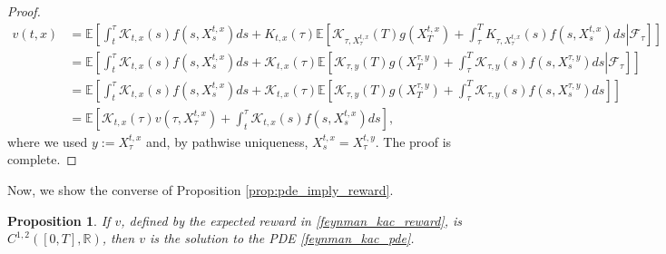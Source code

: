 \documentclass{article}
\newtheorem{prop}{Proposition}
\begin{document}
\begin{proof}
\begin{equation*}
\begin{aligned}
v(t,x)&=\mathbb{E}\left[\int^\tau_t\mathcal{K}_{t,x}(s)f(s,X_s^{t,x})ds+K_{t,x}(\tau)\left.\mathbb{E}\left[\mathcal{K}_{\tau,X_\tau^{t,x}}(T)g(X_T^{t,x})+\int^T_\tau K_{\tau,X_\tau^{t,x}}(s)f(s,X_s^{t,x})ds\right\vert\mathcal{F}_\tau\right]\right]\\
&=\mathbb{E}\left[\int^\tau_t\mathcal{K}_{t,x}(s)f(s,X_s^{t,x})ds+\mathcal{K}_{t,x}(\tau)\left.\mathbb{E}\left[\mathcal{K}_{\tau,y}(T)g(X_T^{\tau,y})+\int^T_\tau \mathcal{K}_{\tau,y}(s)f(s,X_s^{\tau,y})ds\right\vert\mathcal{F}_\tau\right]\right]\\
&=\mathbb{E}\left[\int^\tau_t\mathcal{K}_{t,x}(s)f(s,X_s^{t,x})ds+\mathcal{K}_{t,x}(\tau)\mathbb{E}\left[\mathcal{K}_{\tau,y}(T)g(X_T^{\tau,y})+\int^T_\tau \mathcal{K}_{\tau,y}(s)f(s,X_s^{\tau,y})ds\right]\right]\\
&=\mathbb{E}\left[\mathcal{K}_{t,x}(\tau)v(\tau,X_\tau^{t,x})+\int^\tau_t\mathcal{K}_{t,x}(s)f(s,X_s^{t,x})ds\right],
\end{aligned}
\end{equation*}
where we used $y:=X_\tau^{t,x}$ and, by pathwise uniqueness, $X_s^{t,x}=X_\tau^{t,y}$. The proof is complete.
\end{proof}

Now, we show the converse of Proposition \ref{prop:pde_imply_reward}.

\begin{prop}
If $v$, defined by the expected reward in \eqref{feynman_kac_reward}, is $C^{1,2}([0,T],\mathbb{R})$, then $v$ is the solution to the PDE \eqref{feynman_kac_pde}.
\end{prop}
\end{document}
